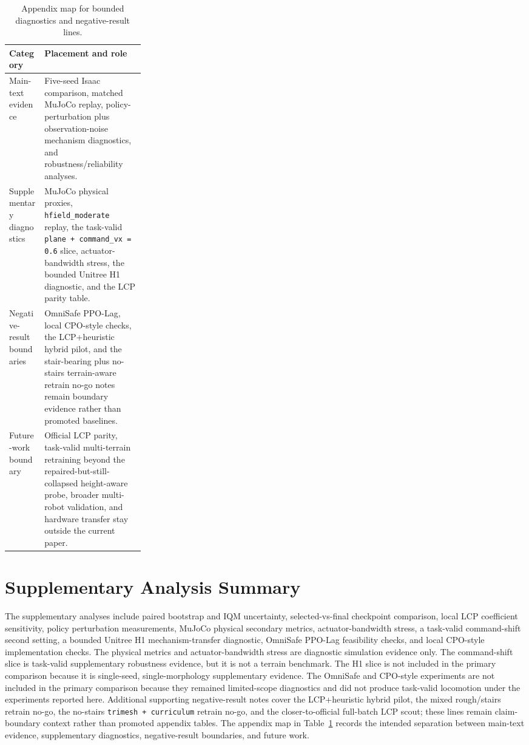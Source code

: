 \documentclass[10pt]{article}
\begin{document}
\begin{table}[htbp]
\centering
\caption{Appendix map for bounded diagnostics and negative-result lines.}
\label{tab:appendix-map}
\small
\begin{tabularx}{\linewidth}{@{}>{\raggedright\arraybackslash}p{0.26\linewidth}>{\raggedright\arraybackslash}X@{}}
\toprule
Category & Placement and role \\
\midrule
Main-text evidence & Five-seed Isaac comparison, matched MuJoCo replay, policy-perturbation plus observation-noise mechanism diagnostics, and robustness/reliability analyses. \\
Supplementary diagnostics & MuJoCo physical proxies, \texttt{hfield\_moderate} replay, the task-valid \texttt{plane + command\_vx = 0.6} slice, actuator-bandwidth stress, the bounded Unitree H1 diagnostic, and the LCP parity table. \\
Negative-result boundaries & OmniSafe PPO-Lag, local CPO-style checks, the LCP+heuristic hybrid pilot, and the stair-bearing plus no-stairs terrain-aware retrain no-go notes remain boundary evidence rather than promoted baselines. \\
Future-work boundary & Official LCP parity, task-valid multi-terrain retraining beyond the repaired-but-still-collapsed height-aware probe, broader multi-robot validation, and hardware transfer stay outside the current paper. \\
\bottomrule
\end{tabularx}
\end{table}

\section{Supplementary Analysis Summary}

The supplementary analyses include paired bootstrap and IQM uncertainty,
selected-vs-final checkpoint comparison, local LCP coefficient sensitivity,
policy perturbation measurements, MuJoCo physical secondary metrics,
actuator-bandwidth stress, a task-valid command-shift second setting, a bounded
Unitree H1 mechanism-transfer diagnostic, OmniSafe PPO-Lag feasibility checks,
and local CPO-style implementation checks. The physical metrics and
actuator-bandwidth stress are diagnostic simulation evidence only. The
command-shift slice is task-valid supplementary robustness evidence, but it is
not a terrain benchmark. The H1 slice is not included in the primary comparison
because it is single-seed, single-morphology supplementary evidence. The
OmniSafe and CPO-style experiments are not included in the primary comparison
because they remained limited-scope diagnostics and did not produce task-valid
locomotion under the experiments reported here. Additional supporting
negative-result notes cover the LCP+heuristic hybrid pilot, the mixed
rough/stairs retrain no-go, the no-stairs \texttt{trimesh + curriculum}
retrain no-go, and the closer-to-official full-batch LCP scout; these lines
remain claim-boundary context rather than promoted appendix tables.
The appendix map in
Table~\ref{tab:appendix-map} records the intended separation between main-text
evidence, supplementary diagnostics, negative-result boundaries, and future
work.
\end{document}
